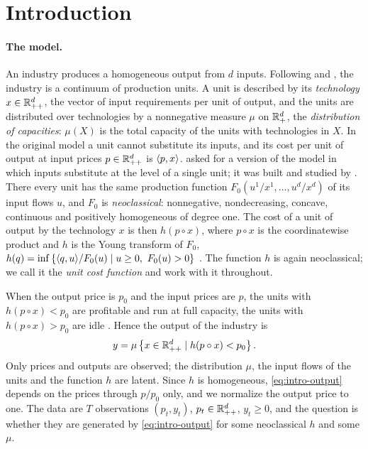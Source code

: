\section{Introduction}\label{sec:intro}

\paragraph{The model.}
An industry produces a homogeneous output from $d$ inputs. Following \citet{Houthakker1955} and \citet{Johansen1972}, the industry is a continuum of production units. A unit is described by its \emph{technology} $x\in\Rpp[d]$, the vector of input requirements per unit of output, and the units are distributed over technologies by a nonnegative measure $\mu$ on $\Rp[d]$, the \emph{distribution of capacities}: $\mu(X)$ is the total capacity of the units with technologies in $X$. In the original model a unit cannot substitute its inputs, and its cost per unit of output at input prices $p\in\Rpp[d]$ is $\ip px$. \citet{Sato1975} asked for a version of the model in which inputs substitute at the level of a single unit; it was built and studied by \citet{Shananin1997a,Shananin1997b}. There every unit has the same production function $F_0(u^1/x^1,\dots,u^d/x^d)$ of its input flows $u$, and $F_0$ is \emph{neoclassical}: nonnegative, nondecreasing, concave, continuous and positively homogeneous of degree one. The cost of a unit of output by the technology $x$ is then $h(p\circ x)$, where $p\circ x$ is the coordinatewise product and $h$ is the Young transform of $F_0$, $h(q)=\inf\set{\ip qu/F_0(u)\mid u\ge0,\ F_0(u)>0}$ \citep[Lemma~4.1]{Shananin1997a}. The function $h$ is again neoclassical; we call it the \emph{unit cost function} and work with it throughout.

When the output price is $p_0$ and the input prices are $p$, the units with $h(p\circ x)<p_0$ are profitable and run at full capacity, the units with $h(p\circ x)>p_0$ are idle \citep[Thm.~4.1]{Shananin1997a}. Hence the output of the industry is
\begin{equation}\label{eq:intro-output}
y=\mu\set{x\in\Rpp[d]\mid h(p\circ x)<p_0}.
\end{equation}
Only prices and outputs are observed; the distribution $\mu$, the input flows of the units and the function $h$ are latent. Since $h$ is homogeneous, \eqref{eq:intro-output} depends on the prices through $p/p_0$ only, and we normalize the output price to one. The data are $T$ observations $(p_t,y_t)$, $p_t\in\Rpp[d]$, $y_t\ge0$, and the question is whether they are generated by \eqref{eq:intro-output} for some neoclassical $h$ and some $\mu$.

